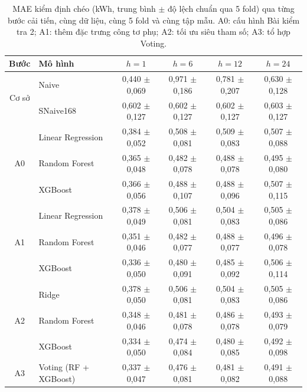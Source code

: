 \begin{table}[htbp]
\centering
\caption[So sánh trước và sau cải tiến (ablation)]{MAE kiểm định chéo (kWh, trung bình $\pm$ độ lệch chuẩn qua 5 fold) qua từng bước cải tiến, cùng dữ liệu, cùng 5 fold và cùng tập mẫu. A0: cấu hình Bài kiểm tra 2; A1: thêm đặc trưng công tơ phụ; A2: tối ưu siêu tham số; A3: tổ hợp Voting.}
\label{tab:ablation}
\footnotesize\setlength{\tabcolsep}{4pt}
\begin{tabular}{|c|l|c|c|c|c|}
\hline
\textbf{Bước} & \textbf{Mô hình} & \textbf{$h = 1$} & \textbf{$h = 6$} & \textbf{$h = 12$} & \textbf{$h = 24$} \\
\hline
\multirow{2}{*}{Cơ sở} & Naive & 0{,}440 $\pm$ 0{,}069 & 0{,}971 $\pm$ 0{,}186 & 0{,}781 $\pm$ 0{,}207 & 0{,}630 $\pm$ 0{,}128 \\
\cline{2-6}
 & SNaive168 & 0{,}602 $\pm$ 0{,}127 & 0{,}602 $\pm$ 0{,}127 & 0{,}602 $\pm$ 0{,}127 & 0{,}603 $\pm$ 0{,}127 \\
\hline
\multirow{3}{*}{A0} & Linear Regression & 0{,}384 $\pm$ 0{,}052 & 0{,}508 $\pm$ 0{,}081 & 0{,}509 $\pm$ 0{,}083 & 0{,}507 $\pm$ 0{,}088 \\
\cline{2-6}
 & Random Forest & 0{,}365 $\pm$ 0{,}048 & 0{,}482 $\pm$ 0{,}078 & 0{,}488 $\pm$ 0{,}078 & 0{,}495 $\pm$ 0{,}080 \\
\cline{2-6}
 & XGBoost & 0{,}366 $\pm$ 0{,}056 & 0{,}488 $\pm$ 0{,}107 & 0{,}488 $\pm$ 0{,}096 & 0{,}507 $\pm$ 0{,}115 \\
\hline
\multirow{3}{*}{A1} & Linear Regression & 0{,}378 $\pm$ 0{,}049 & 0{,}506 $\pm$ 0{,}081 & 0{,}504 $\pm$ 0{,}083 & 0{,}505 $\pm$ 0{,}086 \\
\cline{2-6}
 & Random Forest & 0{,}351 $\pm$ 0{,}046 & 0{,}482 $\pm$ 0{,}077 & 0{,}488 $\pm$ 0{,}077 & 0{,}496 $\pm$ 0{,}078 \\
\cline{2-6}
 & XGBoost & 0{,}336 $\pm$ 0{,}050 & 0{,}480 $\pm$ 0{,}091 & 0{,}485 $\pm$ 0{,}092 & 0{,}506 $\pm$ 0{,}114 \\
\hline
\multirow{3}{*}{A2} & Ridge & 0{,}378 $\pm$ 0{,}050 & 0{,}506 $\pm$ 0{,}081 & 0{,}504 $\pm$ 0{,}083 & 0{,}505 $\pm$ 0{,}086 \\
\cline{2-6}
 & Random Forest & 0{,}348 $\pm$ 0{,}046 & 0{,}481 $\pm$ 0{,}078 & 0{,}486 $\pm$ 0{,}078 & 0{,}493 $\pm$ 0{,}079 \\
\cline{2-6}
 & XGBoost & 0{,}334 $\pm$ 0{,}050 & 0{,}474 $\pm$ 0{,}084 & 0{,}480 $\pm$ 0{,}085 & 0{,}492 $\pm$ 0{,}098 \\
\hline
\multirow{1}{*}{A3} & Voting (RF + XGBoost) & 0{,}337 $\pm$ 0{,}047 & 0{,}476 $\pm$ 0{,}081 & 0{,}481 $\pm$ 0{,}082 & 0{,}491 $\pm$ 0{,}088 \\
\hline
\end{tabular}
\end{table}
